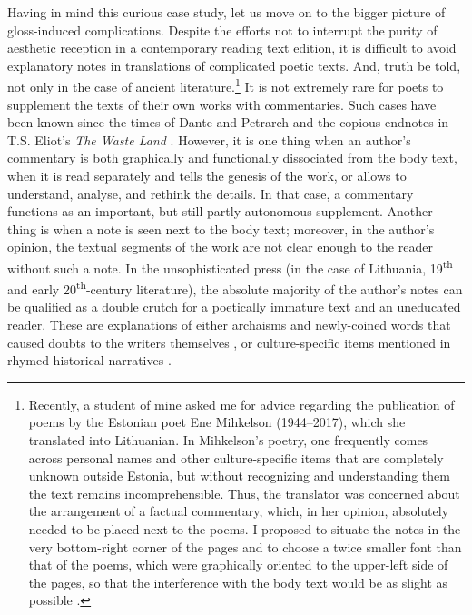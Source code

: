 \begin{paper}
Having in mind this curious case study, let us move on to the bigger
picture of gloss-induced complications. Despite the efforts not to
interrupt the purity of aesthetic reception in a contemporary reading
text edition, it is difficult to avoid explanatory notes in translations
of complicated poetic texts. And, truth be told, not only in the case of
ancient literature.\footnote{Recently, a student of mine asked me for
  advice regarding the publication of poems by the Estonian poet Ene
  Mihkelson (1944--2017), which she translated into Lithuanian. In
  Mihkelson's poetry, one frequently comes across personal names and
  other culture-specific items that are completely unknown outside
  Estonia, but without recognizing and understanding them the text
  remains incomprehensible. Thus, the translator was concerned about the
  arrangement of a factual commentary, which, in her opinion, absolutely
  needed to be placed next to the poems. I proposed to situate the notes
  in the very bottom-right corner of the pages and to choose a twice
  smaller font than that of the poems, which were graphically oriented
  to the upper-left side of the pages, so that the interference with the
  body text would be as slight as possible \citep{mihkelson_bokstas_2022}.} It is not extremely rare for poets to supplement the texts of their own works with
commentaries. Such cases have been known since the times of Dante and
Petrarch and the copious endnotes in T.S. Eliot's \emph{The Waste Land} \citep[28]{grafton_footnote_1997}. However, it is one thing when an author's commentary is both
graphically and functionally dissociated from the body text, when it is read
separately and tells the genesis of the work, or allows to understand, analyse, and rethink the details. In that case,
a commentary functions as an important, but still partly autonomous
supplement. Another thing is when a note is seen next to the body text;
moreover, in the author's opinion, the textual segments of the work are
not clear enough to the reader without such a note. In the
unsophisticated press (in the case of Lithuania, 19\textsuperscript{th} and early 20\textsuperscript{th}-century
literature), the absolute majority of the author's notes can be
qualified as a double crutch for a poetically immature text and an
uneducated reader. These are explanations of either archaisms and
newly-coined words that caused doubts to the writers themselves \citep[25 and 60]{maironis_pavasario_1905}, or culture-specific items mentioned in
rhymed historical narratives \citep[30--31]{maironis_pavasario_1913}.


\end{paper}
